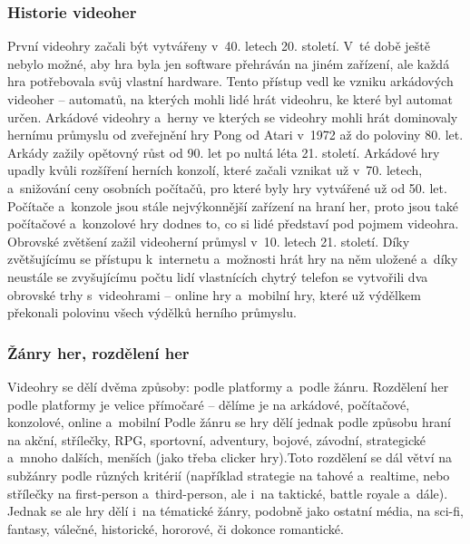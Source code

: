 \documentclass[a4paper]{extarticle}
\begin{document}
\subsubsection{Historie videoher}
První videohry začali být vytvářeny v~40. letech 20. století. V~té době ještě nebylo možné, aby hra byla jen software přehráván na jiném zařízení, ale každá hra potřebovala svůj vlastní hardware. Tento přístup vedl ke vzniku arkádových videoher – automatů, na kterých mohli lidé hrát videohru, ke které byl automat určen. Arkádové videohry a~herny ve kterých se videohry mohli hrát dominovaly hernímu průmyslu od zveřejnění hry Pong od Atari v~1972 až do poloviny 80. let. Arkády zažily opětovný růst od 90. let po nultá léta 21. století.
Arkádové hry upadly kvůli rozšíření herních konzolí, které začali vznikat už v~70. letech, a~snižování ceny osobních počítačů, pro které byly hry vytvářené už od 50. let. Počítače a~konzole jsou stále nejvýkonnější zařízení na hraní her, proto jsou také počítačové a~konzolové hry dodnes to, co si lidé představí pod pojmem videohra.
Obrovské zvětšení zažil videoherní průmysl v~10. letech 21. století. Díky zvětšujícímu se přístupu k~internetu a~možnosti hrát hry na něm uložené a~díky neustále se zvyšujícímu počtu lidí vlastnících chytrý telefon se vytvořili dva obrovské trhy s~videohrami – online hry a~mobilní hry, které už výdělkem překonali polovinu všech výdělků herního průmyslu. \cite{games_revenue}
\subsubsection{Žánry her, rozdělení her}
Videohry se dělí dvěma způsoby: podle platformy a~podle žánru.
Rozdělení her podle platformy je velice přímočaré – dělíme je na arkádové, počítačové, konzolové, online a~mobilní
Podle žánru se hry dělí jednak podle způsobu hraní na akční, střílečky, RPG, sportovní, adventury, bojové, závodní, strategické a~mnoho dalších, menších (jako třeba clicker hry).Toto rozdělení se dál větví na subžánry podle různých kritérií (například strategie na tahové a~realtime, nebo střílečky na first-person a~third-person, ale i~na taktické, battle royale a~dále). Jednak se ale hry dělí i~na tématické žánry, podobně jako ostatní média, na sci-fi, fantasy, válečné, historické, hororové, či dokonce romantické.
\end{document}
